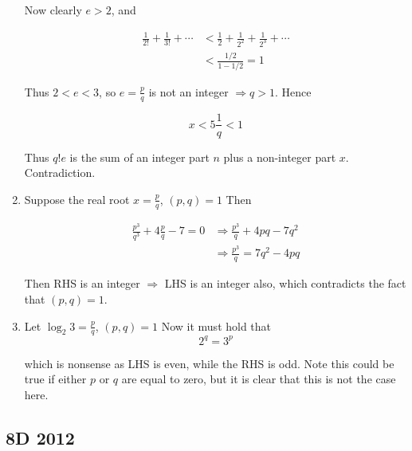 \documentclass[a4paper]{article}
\begin{document}
\begin{enumerate}
	Now clearly $ e > 2 $, and
	
	\begin{align*}
	\frac{1}{2!}  + \frac{1}{3!} + \cdots & < \frac{1}{2} + \frac{1}{2^{2}} + \frac{1}{2^{3}} + \cdots \\
	& < \frac{1/2}{1 - 1/2} = 1 
	\end{align*}
	
	Thus $ 2 < e < 3 $, so $ e  = \frac{p}{q} $ is not an integer $ \Rightarrow q > 1 $. Hence
	
	\[ x < 5\frac{1}{q} < 1 \]
	
	Thus $q!e$ is the sum of an integer part $n$ plus a non-integer part $x$.
	Contradiction.

	
	\item Suppose the real root $ x = \frac{p}{q} $, $ (p,q) = 1 $ Then
	
	\begin{align*}
	\frac{p^{3}}{q^{3}} + 4 \frac{p}{q} - 7 = 0 & \Rightarrow \frac{p^{3}}{q} + 4pq - 7q^{2}  \\
	& \Rightarrow \frac{p^{3}}{q} = 7 q^{2} - 4pq 
	\end{align*}
	
	Then RHS is an integer $ \Rightarrow $ LHS is an integer also, which contradicts the fact that $ (p,q) = 1 $.
	
	
	\item 
		Let $ \log_{2} 3 = \frac{p}{q} $, $ (p,q) = 1 $ Now it must hold that 
	\[ 2^{q} = 3^{p} \]
	
	which is nonsense as LHS is even, while the RHS is odd.
	Note this could be true if either $ p $ or $ q $ are equal to zero, but it is clear that this is not the case here.	
	\end{enumerate}


\subsection*{8D 2012}
\end{document}
